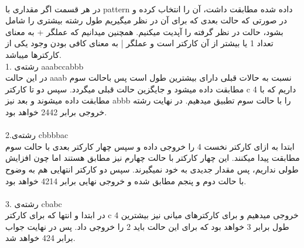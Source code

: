

\\در هر قسمت اگر مقداری با pattern داده شده مطابقت داشت، آن را انتخاب کرده و در صورتی که حالت بعدی که برای آن در نظر میگیریم طول رشته بیشتری را شامل بشود، حالت در نظر گرفته را آپدیت میکنیم. همچنین میدانیم که عملگر + به معنای تعداد 1 یا بیشتر از آن کارکتر است و عملگر | به معنای کافی بودن وجود یکی از کارکترها میباشد.
\\1. رشته‌ی aaabccabbb
\\
در این حالت aaab نسبت به حالات قبلی دارای بیشترین طول است پس باحالت سوم مطابقت داده میشود و جایگزین حالت قبلی میگردد. سپس دو تا کارکتر c داریم که با 4 مطابقت داده میشوند و بعد نیز abbb را با حالت سوم تطبیق میدهیم. در نهایت رشته خروجی برابر 2442 خواهد بود.
\\
\\2.رشته‌ی cbbbbac
\\
ابتدا به ازای کارکتر نخست 4 را خروجی داده و سپس چهار کارکتر بعدی با حالت سوم مطابقت پیدا میکنند. این چهار کارکتر با حالت چهارم نیز مطابق هستند اما چون افزایش طولی نداریم، پس مقدار جدیدی به خود نمیگیرند. سپس دو کارکتر انتهایی هم به وضوح با حالت دوم و پنجم مطابق شده و خروجی نهایی برابر 4214 خواهد بود.
\\
\\3. رشته‌ی cbabc
\\
در ابتدا و انتها که برای کارکتر c 4 خروجی میدهیم و برای کارکترهای میانی نیز بیشترین طول برابر 3 خواهد بود که برای این حالت باید 2 را خروجی داد. پس در نهایت جواب برابر 424 خواهد شد.
